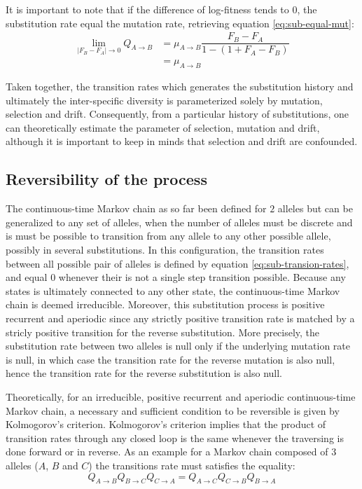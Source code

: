 It is important to note that if the difference of log-fitness tends to $0$, the \gls{substitution} rate equal the mutation rate, retrieving equation \ref{eq:sub-equal-mut}:
\begin{align}
\lim_{|F_{B} - F_{A}| \to 0} Q_{A \to B} & = \mu_{A \to B}   \dfrac{F_{B} - F_{A}}{{1 - (1 + {F_{A} - F_{B}}) }} \nonumber \\
& =  \mu_{A \to B} 
\end{align}


Taken together, the transition rates which generates the \gls{substitution} history and ultimately the inter-specific diversity is parameterized solely by mutation, selection and drift.
Consequently, from a particular history of substitutions, one can theoretically estimate the parameter of selection, mutation and drift, although it is important to keep in minds that selection and drift are confounded.

\subsection{Reversibility of the process}
The continuous-time Markov chain as so far been defined for $2$ alleles but can be generalized to any set of alleles, when the number of alleles must be discrete and is must be possible to transition from any allele to any other possible allele, possibly in several substitutions.
In this configuration, the transition rates between all possible pair of alleles is defined by equation \ref{eq:sub-transion-rates}, and equal $0$ whenever their is not a single step transition possible.  
Because any states is ultimately connected to any other state, the continuous-time Markov chain is deemed irreducible.
Moreover, this substitution process is positive recurrent and aperiodic since any strictly positive transition rate is matched by a stricly positive transition for the reverse substitution.
More precisely, the substitution rate between two alleles is null only if the underlying mutation rate is null, in which case the transition rate for the reverse mutation is also null, hence the transition rate for the reverse substitution is also null.

Theoretically, for an irreducible, positive recurrent and aperiodic continuous-time Markov chain, a necessary and sufficient condition to be reversible is given by Kolmogorov's criterion.
Kolmogorov's criterion implies that the product of transition rates through any closed loop is the same whenever the traversing is done forward or in reverse.
As an example for a Markov chain composed of $3$ alleles ($A$, $B$ and $C$) the transitions rate must satisfies the equality:
\begin{equation}
Q_{A \to B}Q_{B \to C}Q_{C \to A} = Q_{A \to C}Q_{C \to B}Q_{B \to A}
\end{equation}

